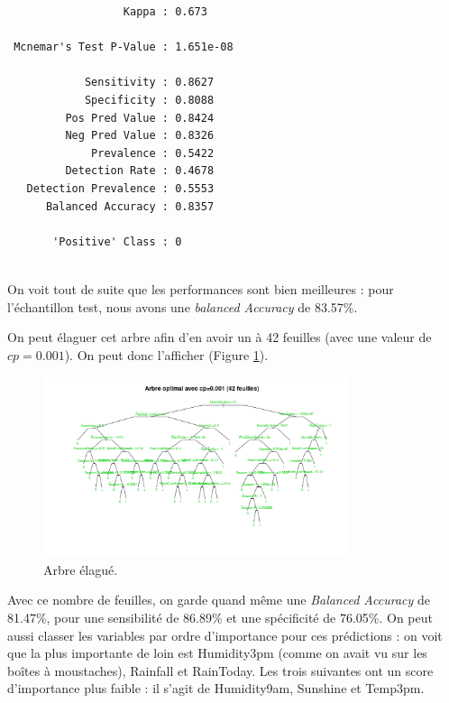 \documentclass{article}
\begin{document}
\begin{multicols}{2}
\begin{verbatim}
                  Kappa : 0.673           
                                          
 Mcnemar's Test P-Value : 1.651e-08       
                                          
            Sensitivity : 0.8627          
            Specificity : 0.8088          
         Pos Pred Value : 0.8424          
         Neg Pred Value : 0.8326          
             Prevalence : 0.5422          
         Detection Rate : 0.4678          
   Detection Prevalence : 0.5553          
      Balanced Accuracy : 0.8357          
                                          
       'Positive' Class : 0               
                              
    \end{verbatim}
\end{multicols}
     
On voit tout de suite que les performances sont bien meilleures : pour l'échantillon test, nous avons une \emph{balanced Accuracy} de 83.57\%. 

On peut élaguer cet arbre afin d'en avoir un à 42 feuilles (avec une valeur de $cp=0.001$). On peut donc l'afficher (Figure \ref{fig:topt}). 

\begin{figure}[htp]
    \centering
    \includegraphics[width=0.8\textwidth]{Images/topt.png}
    \caption{Arbre élagué.}
    \label{fig:topt}
\end{figure}

Avec ce nombre de feuilles, on garde quand même une \emph{Balanced Accuracy} de 81.47\%, pour une sensibilité de 86.89\% et une spécificité de 76.05\%. On peut aussi classer les variables par ordre d'importance pour ces prédictions : on voit que la plus importante de loin est Humidity3pm (comme on avait vu sur les boîtes à moustaches), Rainfall et RainToday. Les trois suivantes ont un score d'importance plus faible : il s'agit de Humidity9am, Sunshine et Temp3pm.
\end{document}
